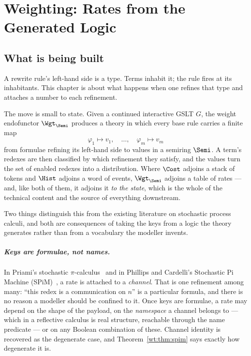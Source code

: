 \chapter{Weighting: Rates from the Generated Logic}
\label{ch:weight}

\section{What is being built}

A rewrite rule's left-hand side is a type. Terms inhabit it; the rule fires at its
inhabitants. This chapter is about what happens when one refines that type and attaches
a number to each refinement.

The move is small to state. Given a continued interactive GSLT $G$, the weight
endofunctor $\Wgt_{\Semi}$ produces a theory in which every base rule carries a finite
map
\[
  \varphi_1 \mapsto v_1, \quad \ldots, \quad \varphi_m \mapsto v_m
\]
from formulae refining its left-hand side to values in a semiring $\Semi$. A term's
redexes are then classified by which refinement they satisfy, and the values turn the
set of enabled redexes into a distribution. Where $\Cost$ adjoins a stack of tokens and
$\Hist$ adjoins a word of events, $\Wgt_{\Semi}$ adjoins a table of rates --- and, like
both of them, it adjoins it \emph{to the state}, which is the whole of the technical
content and the source of everything downstream.

Two things distinguish this from the existing literature on stochastic process calculi,
and both are consequences of taking the keys from a logic the theory generates rather
than from a vocabulary the modeller invents.

\paragraph{Keys are formulae, not names.} In Priami's stochastic
$\pi$-calculus~\cite{priami} and in Phillips and Cardelli's Stochastic Pi Machine
(SPiM)~\cite{spim}, a rate is attached to a \emph{channel}. That is one refinement among
many: ``this redex is a communication on $n$'' is a particular formula, and there is no
reason a modeller should be confined to it. Once keys are formulae, a rate may depend on
the shape of the payload, on the \emph{namespace} a channel belongs to --- which in a
reflective calculus is real structure, reachable through the name predicate --- or on any
Boolean combination of these. Channel identity is recovered as the degenerate case, and
Theorem~\ref{wt:thm:spim} says exactly how degenerate it is.

